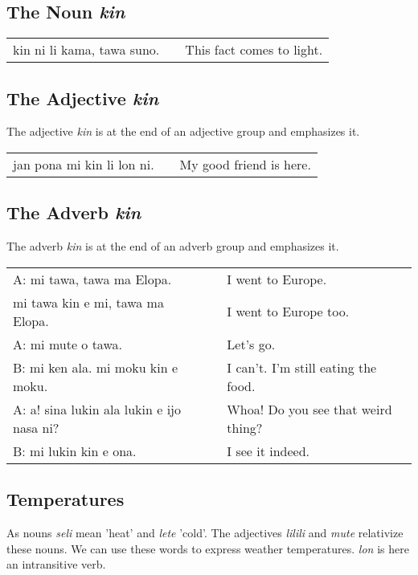 \subsection*{The Noun \textit{kin}}

\begin{supertabular}{p{5,5cm}|ll}
    kin ni li kama, tawa suno. &  & This fact comes to light. \\
\end{supertabular}

\subsection*{The Adjective \textit{kin}}
The adjective \textit{kin} is at the end of an adjective group and emphasizes it.

\begin{supertabular}{p{5,5cm}|ll}
    jan pona mi kin li lon ni. &  & My good friend is here. \\
\end{supertabular}

\subsection*{The Adverb \textit{kin}}
The adverb \textit{kin} is at the end of an adverb group and emphasizes it.

\begin{supertabular}{p{5,5cm}|ll}
    A: mi tawa, tawa ma Elopa.                &  & I went to Europe.                   \\
    mi tawa kin e mi, tawa ma Elopa.          &  & I went to Europe too.               \\
    A: mi mute o tawa.                        &  & Let's go.                           \\
    B: mi ken ala. mi moku kin e moku.        &  & I can't. I'm still eating the food. \\
    A: a! sina lukin ala lukin e ijo nasa ni? &  & Whoa! Do you see that weird thing?  \\
    B: mi lukin kin e ona.                    &  & I see it indeed.                    \\
\end{supertabular}

\subsection*{Temperatures}
As nouns \textit{seli} mean 'heat' and \textit{lete} 'cold'.
The adjectives \textit{lilili} and \textit{mute} relativize these nouns.
We can use these words to express weather temperatures.
\textit{lon} is here an intransitive verb.

